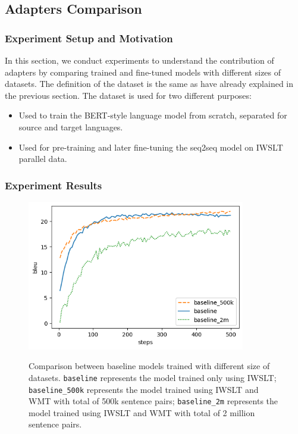 \subsection{Adapters Comparison}
\label{ssec:adaptcomp}
\subsubsection{Experiment Setup and Motivation}
In this section, we conduct experiments to understand the contribution of adapt\-ers by comparing trained and fine-tuned models with different sizes of datasets. The definition of the dataset is the same as have already explained in the previous section. The dataset is used for two different purposes:
\begin{itemize}
    \item Used to train the BERT-style language model from scratch, separated for source and target languages.
    \item Used for pre-training and later fine-tuning the seq2seq model on IWSLT parallel data.
\end{itemize}

\subsubsection{Experiment Results}
\begin{figure}[h]
    {\includegraphics[width=0.85\textwidth]{img/baseline.png}}
    \centering
    \caption[Comparison between baseline models trained with different size of datasets.]{
        Comparison between baseline models trained with different size of datasets. \texttt{baseline} represents the model trained only using IWSLT; \texttt{baseline\_500k} represents the model trained using IWSLT and WMT with total of 500k sentence pairs; \texttt{baseline\_2m} represents the model trained using IWSLT and WMT with total of 2 million sentence pairs.}
    \label{img:basecomp}
\end{figure}

